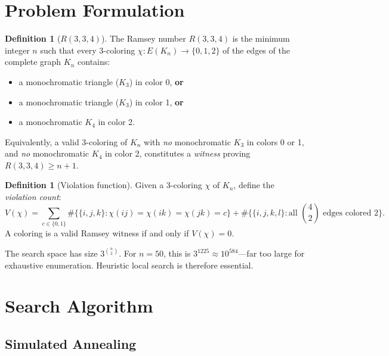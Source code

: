 \documentclass[11pt,a4paper]{article}
\theoremstyle{definition}
\newtheorem{definition}[theorem]{Definition}
\theoremstyle{remark}
\begin{document}
\section{Problem Formulation}\label{sec:formulation}

\begin{definition}[$R(3,3,4)$]\label{def:R334}
The Ramsey number $R(3,3,4)$ is the minimum integer $n$ such that every
3-coloring $\chi : E(K_n) \to \{0,1,2\}$ of the edges of the complete
graph $K_n$ contains:
\begin{itemize}
  \item a monochromatic triangle ($K_3$) in color 0, \textbf{or}
  \item a monochromatic triangle ($K_3$) in color 1, \textbf{or}
  \item a monochromatic $K_4$ in color 2.
\end{itemize}
\end{definition}

Equivalently, a valid 3-coloring of $K_n$ with \emph{no} monochromatic
$K_3$ in colors 0 or 1, and \emph{no} monochromatic $K_4$ in color 2,
constitutes a \emph{witness} proving $R(3,3,4) \ge n+1$.

\begin{definition}[Violation function]\label{def:violations}
Given a 3-coloring $\chi$ of $K_n$, define the \emph{violation count}:
\begin{equation}\label{eq:violations}
  V(\chi) = \sum_{c \in \{0,1\}} \#\bigl\{\{i,j,k\} :
    \chi(ij) = \chi(ik) = \chi(jk) = c\bigr\}
  + \#\bigl\{\{i,j,k,l\} :
    \text{all } \binom{4}{2} \text{ edges colored 2}\bigr\}.
\end{equation}
A coloring is a valid Ramsey witness if and only if $V(\chi) = 0$.
\end{definition}

The search space has size $3^{\binom{n}{2}}$.  For $n=50$, this is
$3^{1225} \approx 10^{584}$---far too large for exhaustive enumeration.
Heuristic local search is therefore essential.


\section{Search Algorithm}\label{sec:algorithm}

\subsection{Simulated Annealing}\label{sec:sa}
\end{document}
